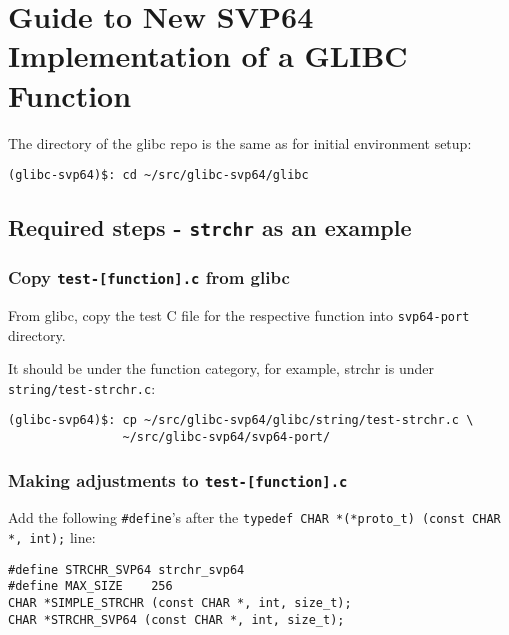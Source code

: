 %
\section{Guide to New SVP64 Implementation of a GLIBC Function}
\label{sec:adding_new_func}

The directory of the glibc repo is the same as for initial environment setup:

\begin{verbatim}
(glibc-svp64)$: cd ~/src/glibc-svp64/glibc
\end{verbatim}

\subsection{Required steps - \texttt{strchr} as an example}

\subsubsection{Copy \texttt{test-[function].c} from glibc}

From glibc, copy the test C file for the respective function
into \texttt{svp64-port} directory.

It should be under the function category, for example, strchr is
under \texttt{string/test-strchr.c}:

\begin{verbatim}
(glibc-svp64)$: cp ~/src/glibc-svp64/glibc/string/test-strchr.c \
                ~/src/glibc-svp64/svp64-port/
\end{verbatim}

\subsubsection{Making adjustments to \texttt{test-[function].c}}

Add the following \texttt{\#define}'s after the
\texttt{typedef CHAR *(*proto\_t) (const CHAR *, int);} line:

\begin{verbatim}
#define STRCHR_SVP64 strchr_svp64
#define MAX_SIZE    256
CHAR *SIMPLE_STRCHR (const CHAR *, int, size_t);
CHAR *STRCHR_SVP64 (const CHAR *, int, size_t);
\end{verbatim}

